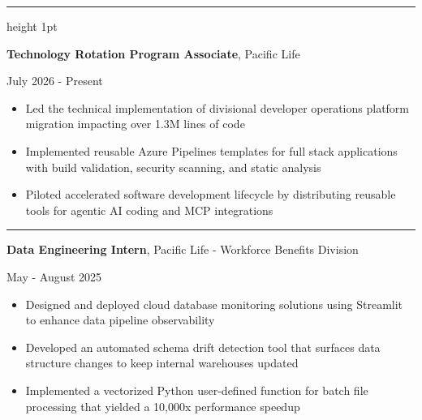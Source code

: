 \documentclass[letter]{article}
\begin{document}
    \vspace{4pt}
    \hrule height 1pt
    \vspace{4pt}
    \noindent
    \begin{minipage}[c]{0.65\linewidth}
        \noindent \textbf{Technology Rotation Program Associate}, Pacific Life
    \end{minipage}
    \begin{minipage}[c]{0.345\linewidth}
        \begin{flushright}
            July 2026 - Present
        \end{flushright}
    \end{minipage}
    \noindent
    \begin{itemize}[noitemsep, topsep=0pt]
        \item Led the technical implementation of divisional developer operations platform migration impacting over 1.3M lines of code
        \item Implemented reusable Azure Pipelines templates for full stack applications with build validation, security scanning, and static analysis
        \item Piloted accelerated software development lifecycle by distributing reusable tools for agentic AI coding and MCP integrations
    \end{itemize}
    \medskip

    \hrule
    \vspace{4pt}
    \noindent
    \begin{minipage}[c]{0.65\linewidth}
        \noindent \textbf{Data Engineering Intern}, Pacific Life - Workforce Benefits Division
    \end{minipage}
    \begin{minipage}[c]{0.345\linewidth}
        \begin{flushright}
            May - August 2025
        \end{flushright}
    \end{minipage}
    \noindent
    \begin{itemize}[noitemsep, topsep=0pt]
        \item Designed and deployed cloud database monitoring solutions using Streamlit to enhance data pipeline observability
        \item Developed an automated schema drift detection tool that surfaces data structure changes to keep internal warehouses updated
        \item Implemented a vectorized Python user-defined function for batch file processing that yielded a 10,000x performance speedup
    \end{itemize}
    \medskip
\end{document}
